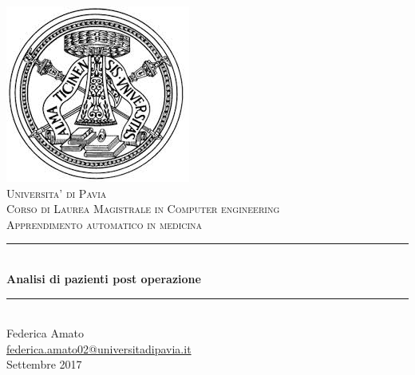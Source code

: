\documentclass[a4paper, 12p]{report}
\begin{document}
\begin{titlepage}
	\centering
	\includegraphics[scale = 0.4]{img/logo.jpeg}\\[1.0 cm]
	\textsc{\LARGE Universita' di Pavia}\\[1.0 cm]
	\textsc{\LARGE Corso di Laurea Magistrale in Computer engineering}\\[1 cm]
	\textsc{\Large Apprendimento automatico in medicina}\\[0.5 cm]
	\rule{\linewidth}{0.2 mm} \\[0.4 cm]
	{\huge{\textbf{Analisi di pazienti post operazione}}}\\
	\rule{\linewidth}{0.2 mm} \\[1 cm]

	{\large Federica Amato} \\[0.2 cm]
	\url{federica.amato02@universitadipavia.it}
	 \\[0.2 cm]
	{Settembre 2017}
\end{titlepage}

\tableofcontents
\end{document}
